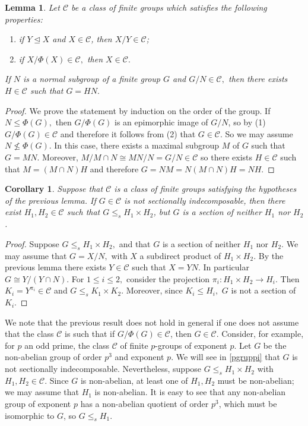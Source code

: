 \documentclass[10pt,a4paper]{amsart}
\newtheorem{corollary}[thm]{Corollary}
\newtheorem{lemma}[thm]{Lemma}
\begin{document}
\begin{lemma}\label{class}Let $\mathcal C$ be a class of finite groups which satisfies the following properties:
	\begin{enumerate}
		\item if $Y \unlhd X$ and $X \in \mathcal{C}$, then $X/Y \in \mathcal{C}$;
		\item if $X/\Phi(X)\in \mathcal C,$ then $X\in \mathcal C.$
	\end{enumerate}
	If $N$ is a normal subgroup of a finite group $G$ and $G/N\in \mathcal C,$ then there exists $H\in \mathcal C$ such that $G=HN.$
\end{lemma}
\begin{proof}
	We prove the statement by induction on the order of the group. If $N\leq \Phi(G),$ then $G/\Phi(G)$ is an epimorphic image of $G/N$, so
	by (1) $G/\Phi(G) \in \mathcal C$ and therefore it follows from (2)
	that $G\in \mathcal C.$
	So we may assume $N\not\leq \Phi(G).$ In this case, there exists a maximal subgroup $M$ of $G$ such that $G=MN.$ Moreover, $M/M\cap N \cong MN/N= G/N \in  \mathcal C$ so there exists $H\in \mathcal C$ such that
	$M=(M\cap N)H$ and therefore $G=NM=N(M\cap N)H=NH.$
\end{proof}

\begin{corollary}Suppose that $\mathcal{C}$ is a class of finite groups satisfying the 
hypotheses of the previous lemma. If $G \in \mathcal{C}$ is not sectionally
indecomposable, then there exist $H_1, H_2 \in \mathcal{C}$ such that 
$G \leq_s H_1 \times H_2$, but $G$ is a section of neither $H_1$ nor $H_2$.
\end{corollary}

\begin{proof}Suppose $G\leq_s H_1\times H_2,$ and that $G$ is a section  of neither $H_1$ nor $H_2.$ We may assume that $G=X/N,$ with $X$ a subdirect product of $H_1\times H_2.$ By the previous lemma there exists $Y\in \mathcal C$ such that $X=YN$. In particular $G\cong Y/(Y\cap N).$ For $1\leq i\leq 2,$ consider the projection $\pi_i: H_1\times H_2\to H_i$. Then $K_i=Y^{\pi_i}\in \mathcal C$ and $G\leq_s K_1\times K_2.$ Moreover, since $K_i\leq H_i,$ $G$ is not a section of $K_i.$
\end{proof}

We note that the previous result does not hold in general if one does not assume
that the class $\mathcal{C}$ is such that if $G/\Phi(G) \in \mathcal{C}$,
then $G \in \mathcal{C}$. Consider, for example, for $p$ an odd prime,
the class $\mathcal{C}$ of finite $p$-groups of exponent $p$.
Let $G$ be the non-abelian group of order $p^3$ and exponent $p$.
We will see in \cref{pgruppi} that $G$ is not sectionally indecomposable. Nevertheless, suppose $G \leq_s H_1 \times H_2$ with $H_1, H_2 \in \mathcal{C}$.
Since $G$ is non-abelian, at least one of $H_1, H_2$ must be non-abelian; we may assume that $H_1$ is non-abelian. It is easy to see that any non-abelian group of exponent $p$ has a non-abelian quotient of order $p^3$, which must be isomorphic to $G$, so $G \leq_s H_1$.
\end{document}
